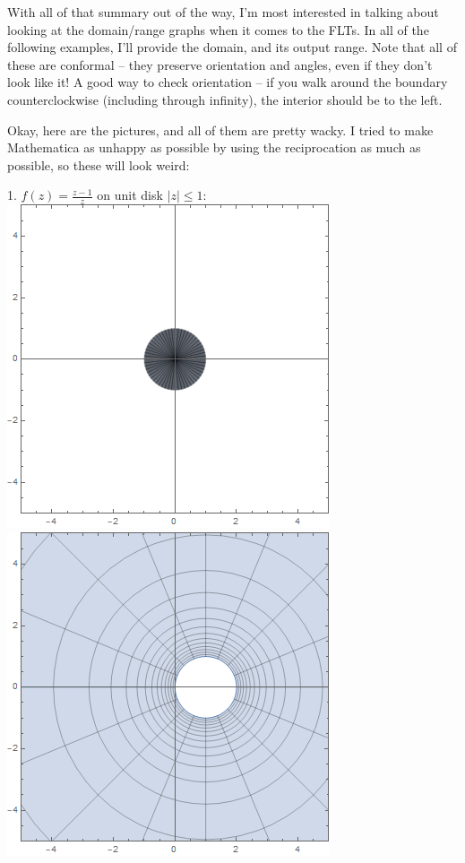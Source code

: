 \documentclass[12pt]{scrartcl}
\begin{document}
With all of that summary out of the way, I'm most interested in talking about looking at the domain/range graphs when it comes to the FLTs. In all of the following examples, I'll provide the domain, and its output range. Note that all of these are conformal -- they preserve orientation and angles, even if they don't look like it! A good way to check orientation -- if you walk around the boundary counterclockwise (including through infinity), the interior should be to the left.

Okay, here are the pictures, and all of them are pretty wacky.  I tried to make Mathematica as unhappy as possible by using the reciprocation as much as possible, so these will look weird:
\begin{center}
	1. $f(z) = \frac{z-1}{z}$ on unit disk $|z| \leq 1$: \\
	\includegraphics[scale=0.3]{images/mobius1dom.png}
	\includegraphics[scale=0.3]{images/mobius1ran.png}
\end{center}
\end{document}
